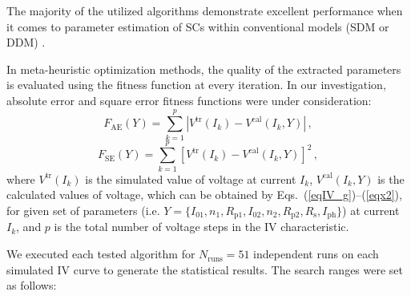 \documentclass[a4paper,fleqn]{cas-dc}
\begin{document}
%

The majority of the utilized algorithms demonstrate excellent performance when
it comes to parameter estimation of SCs within conventional models (SDM or DDM) \cite{CWOA,DEWang,GOTLBO,IJAYA,MABC,PSO,STLBO,TLBO_Patel,LSHADE,IWOA}.

In meta-heuristic optimization methods, the quality of the extracted parameters is evaluated using the fitness function at
every iteration.
In our investigation, absolute error and square error fitness functions were under consideration:
\begin{equation}
\label{eqFae}
F_\mathrm{AE}(Y)= \sum_{k=1}^p \left|V^\mathrm{tr}(I_k)-V^\mathrm{cal}(I_k,Y)\right|\,,
\end{equation}
\begin{equation}
\label{eqFse}
F_\mathrm{SE}(Y)= \sum_{k=1}^p \left[V^\mathrm{tr}(I_k)-V^\mathrm{cal}(I_k,Y)\right]^2\,,
\end{equation}
where
$V^\mathrm{tr}(I_k)$ is the simulated value of voltage at current $I_k$,
$V^\mathrm{cal}(I_k,Y)$ is the calculated values of voltage, which can be obtained
by Eqs.~(\ref{eqIV_g})--(\ref{eqx2}),
for given set of parameters (i.e. $Y = \{I_{01},n_1,R_\mathrm{p1},I_{02},n_2,R_\mathrm{p2},R_\mathrm{s},I_\mathrm{ph}\}$)
at current $I_k$,
and $p$ is the total number of voltage steps in the IV characteristic.



We executed each tested algorithm for $N_\mathrm{runs}=51$ independent runs on each simulated IV curve
to generate the statistical results.
The search ranges were set as follows:
\end{document}
